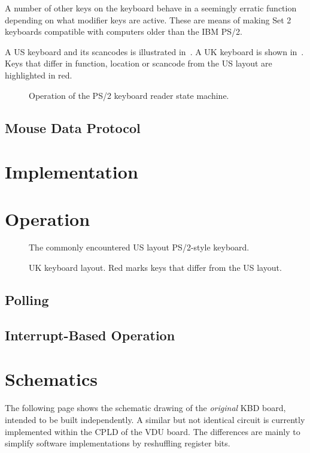 A number of other keys on the keyboard behave in a seemingly erratic function
depending on what modifier keys are active. These are means of making Set 2
keyboards compatible with computers older than the IBM PS/2.

A US keyboard and its scancodes is illustrated in~. A
UK keyboard is shown in~. Keys that differ in
function, location or scancode from the US layout are highlighted in
red.


\begin{figure}
  \centering
  \caption[PS/2 Set 2 State Machine
    Flowchart]{\label{fig:kbd-key-fsm-flowchart}Operation of the PS/2
    keyboard reader state machine.}
\end{figure}

\subsection{Mouse Data Protocol}

\section{Implementation}

\section{Operation}


\begin{figure}
  \centering
  \caption{\label{fig:kbd-us} The commonly encountered  US layout PS/2-style keyboard.}
\end{figure}

\begin{figure}
  \centering
  \caption{\label{fig:kbd-uk} UK keyboard layout. Red marks keys that differ from the US layout.}
\end{figure}

\subsection{Polling}

\subsection{Interrupt-Based Operation}

\section{Schematics}

The following page shows the schematic drawing of the {\em original\/} KBD
board, intended to be built independently. A similar but not identical circuit
is currently implemented within the CPLD of the VDU board. The differences are
mainly to simplify software implementations by reshuffling register bits.

\cleardoublepage
{}
